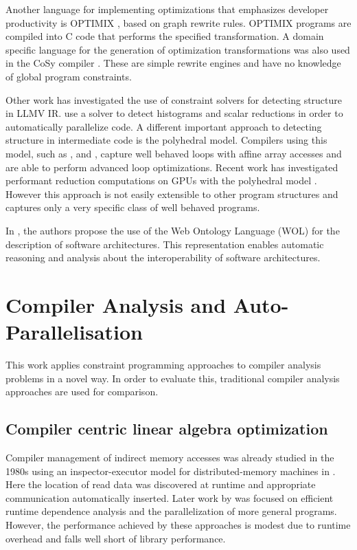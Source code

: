     Another language for implementing optimizations that emphasizes developer
    productivity is OPTIMIX \citep{Assmann1996,Assmann98optimix}, based on graph
    rewrite rules.
    OPTIMIX programs are compiled into C code that performs the specified
    transformation.
    A domain specific language for the generation of optimization
    transformations was also used in the CoSy compiler \citep{Alt1994}.
    These are simple rewrite engines and have no knowledge of global program
    constraints.

    Other work has investigated the use of constraint solvers for
    detecting structure in LLMV IR.
    \citet{ginsbach2017discovery} use a solver to detect histograms and
    scalar reductions in order to automatically parallelize code.
    A different important approach to detecting structure in intermediate
    code is the polyhedral model.
    Compilers using this model, such as
    \citet{Lengauer2012Polly}, \citet{Baskaran:2010:ACC:2175462.2175482} and
    \citet{Verdoolaege:2013:PPC:2400682.2400713}, capture well behaved
    loops with affine array accesses and are able to perform advanced loop
    optimizations.
    Recent work has investigated performant reduction computations on GPUs with
    the polyhedral model \citep{Reddy2016Reduction}.
    However this approach is not easily extensible to other program structures
    and captures only a very specific class of well behaved programs.

    In \cite{Yuan:2017:TOS:3101282.3101287}, the authors propose the use of the
    Web Ontology Language (WOL) for the description of software architectures.
    This representation enables automatic reasoning and analysis about the
    interoperability of software architectures.

\section{Compiler Analysis and Auto-Parallelisation}

    This work applies constraint programming approaches to compiler analysis
    problems in a novel way.
    In order to evaluate this, traditional compiler analysis approaches are
    used for comparison.

\subsection{Compiler centric linear algebra optimization}

    Compiler management of indirect memory accesses was already studied in the
    1980s using an inspector-executor model for distributed-memory machines in
    \citet{Baxter:1989:RPS:72935.72967}.
    Here the location of read data was discovered at runtime and appropriate
    communication automatically inserted.
    Later work by \citet{pottenger1995idiom,fisher1994parallelizing,
    rauchwerger1999lrpd,suganuma1996detection} was focused on efficient runtime
    dependence analysis and the parallelization of more general programs.
    However, the performance achieved by these approaches is modest due to
    runtime overhead and falls well short of library performance.


